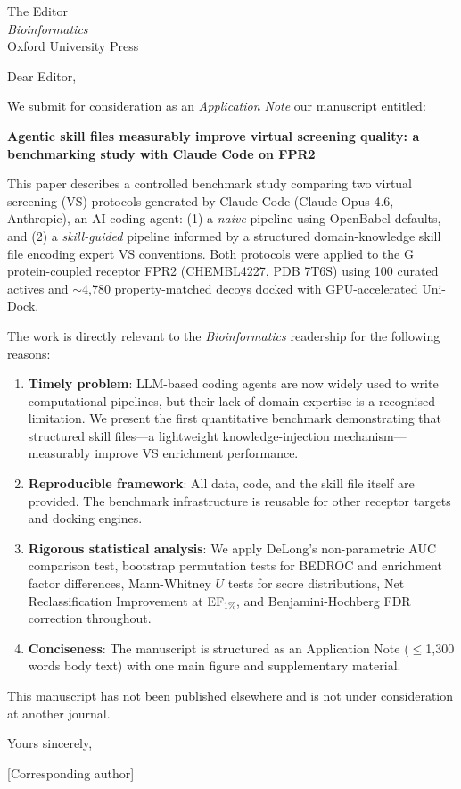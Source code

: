 \documentclass[11pt,a4paper]{letter}
\begin{document}
\begin{letter}{
  The Editor\\
  \textit{Bioinformatics}\\
  Oxford University Press
}

\opening{Dear Editor,}

We submit for consideration as an \textit{Application Note} our manuscript entitled:

\medskip
\textbf{Agentic skill files measurably improve virtual screening quality: a benchmarking study with Claude Code on FPR2}

\medskip
This paper describes a controlled benchmark study comparing two virtual screening (VS) protocols generated by Claude Code (Claude Opus 4.6, Anthropic), an AI coding agent: (1) a \textit{naive} pipeline using OpenBabel defaults, and (2) a \textit{skill-guided} pipeline informed by a structured domain-knowledge skill file encoding expert VS conventions. Both protocols were applied to the G protein-coupled receptor FPR2 (CHEMBL4227, PDB 7T6S) using 100 curated actives and $\sim$4,780 property-matched decoys docked with GPU-accelerated Uni-Dock.

The work is directly relevant to the \textit{Bioinformatics} readership for the following reasons:

\begin{enumerate}

  \item \textbf{Timely problem}: LLM-based coding agents are now widely used to write computational pipelines, but their lack of domain expertise is a recognised limitation. We present the first quantitative benchmark demonstrating that structured skill files—a lightweight knowledge-injection mechanism—measurably improve VS enrichment performance.

  \item \textbf{Reproducible framework}: All data, code, and the skill file itself are provided. The benchmark infrastructure is reusable for other receptor targets and docking engines.

  \item \textbf{Rigorous statistical analysis}: We apply DeLong's non-parametric AUC comparison test, bootstrap permutation tests for BEDROC and enrichment factor differences, Mann-Whitney $U$ tests for score distributions, Net Reclassification Improvement at EF$_{1\%}$, and Benjamini-Hochberg FDR correction throughout.

  \item \textbf{Conciseness}: The manuscript is structured as an Application Note ($\leq$1,300 words body text) with one main figure and supplementary material.

\end{enumerate}

This manuscript has not been published elsewhere and is not under consideration at another journal.

\closing{Yours sincerely,}

[Corresponding author]\\
[Institution]\\
[Email]

\end{letter}
\end{document}

